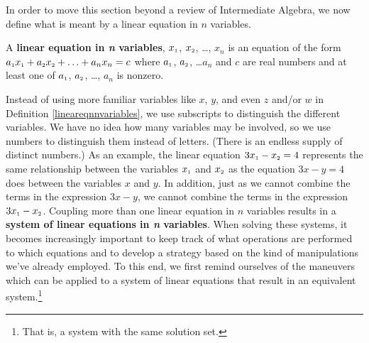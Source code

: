\smallskip

In order to move this section beyond a review of Intermediate Algebra, we now define what is meant by a linear equation in $n$ variables.

\smallskip

\colorbox{ResultColor}{\bbm

\begin{defn}  \label{lineareqnnvariables}  A   \textbf{linear equation in \textit{n} variables}, $x_{\mbox{\tiny $1$}}$, $x_{\mbox{\tiny $2$}}$, \ldots, $x_{n}$ is an equation of the form $a_{\mbox{\tiny $1$}} x_{\mbox{\tiny $1$}} + a_{\mbox{\tiny $2$}} x_{\mbox{\tiny $2$}} + \ldots + a_{n} x_{n} = c$ where $a_{\mbox{\tiny $1$}}$, $a_{\mbox{\tiny $2$}}$, \dots $a_{n}$  and $c$ are real numbers and at least one of $a_{\mbox{\tiny $1$}}$, $a_{\mbox{\tiny $2$}}$, \dots, $a_{n}$ is nonzero.

\end{defn}

\ebm}

\smallskip

Instead of using more familiar variables like $x$, $y$, and even $z$ and/or $w$ in Definition \ref{lineareqnnvariables}, we use subscripts to distinguish the different variables.  We have no idea how many variables may be involved, so we use numbers to distinguish them instead of letters.  (There is an endless supply of distinct numbers.)  As an example, the linear equation $3x_{\mbox{\tiny $1$}} - x_{\mbox{\tiny $2$}} = 4$ represents the same relationship between the variables $x_{\mbox{\tiny $1$}}$ and $x_{\mbox{\tiny $2$}}$  as the equation $3x-y=4$ does between the variables $x$ and $y$. In addition, just as we cannot combine the terms in the expression $3x-y$, we cannot combine the terms in the expression $3x_{\mbox{\tiny $1$}} - x_{\mbox{\tiny $2$}}$.  Coupling more than one linear equation in $n$ variables results in a \textbf{system of linear equations in \textit{n} variables}.  When solving these systems, it becomes increasingly important to keep track of what operations are performed to which equations and to develop a strategy based on the kind of manipulations we've already employed.  To this end, we first remind ourselves of the maneuvers which can be applied to a system of linear equations that result in an equivalent system.\footnote{That is, a system with the same solution set.}  

